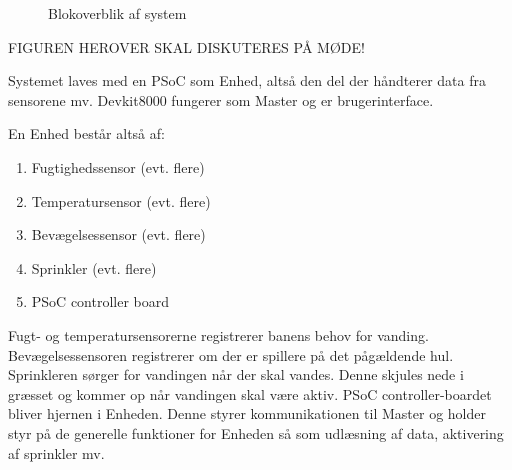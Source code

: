 \begin{figure}[ht] \centering
{}
\caption{Blokoverblik af system}
\label{fig:bloksystemoverblik}
\end{figure}

FIGUREN HEROVER SKAL DISKUTERES PÅ MØDE!

Systemet laves med en PSoC som Enhed, altså den del der håndterer data fra sensorene mv.
Devkit8000 fungerer som Master og er brugerinterface.

En Enhed består altså af:
\begin{enumerate}
\item Fugtighedssensor (evt. flere)
\item Temperatursensor (evt. flere)
\item Bevægelsessensor (evt. flere)
\item Sprinkler (evt. flere)
\item PSoC controller board
\end{enumerate}

Fugt- og temperatursensorerne registrerer banens behov for vanding. Bevægelsessensoren registrerer om der er spillere på det pågældende hul. Sprinkleren sørger for vandingen når der skal vandes. Denne skjules nede i græsset og kommer op når vandingen skal være aktiv.
PSoC controller-boardet bliver hjernen i Enheden. Denne styrer kommunikationen til Master og holder styr på de generelle funktioner for Enheden så som udlæsning af data, aktivering af sprinkler mv.